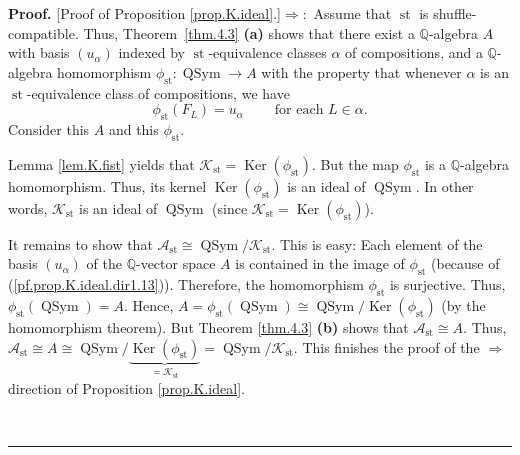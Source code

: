 \documentclass[numbers=enddot,12pt,final,onecolumn,notitlepage]{scrartcl}%
\theoremstyle{definition}
\newenvironment{proof}[1][Proof]{\noindent\textbf{#1.} }{\ \rule{0.5em}{0.5em}}
\newenvironment{verlong}{}{}
\begin{document}
\begin{verlong}
\begin{proof}
[Proof of Proposition \ref{prop.K.ideal}.]$\Longrightarrow:$ Assume that
$\operatorname*{st}$ is shuffle-compatible. Thus, Theorem~\ref{thm.4.3}
\textbf{(a)} shows that there exist a $\mathbb{Q}$-algebra $A$ with basis
$\left(  u_{\alpha}\right)  $ indexed by $\operatorname*{st}$-equivalence
classes $\alpha$ of compositions, and a $\mathbb{Q}$-algebra homomorphism
$\phi_{\operatorname*{st}}:\operatorname*{QSym}\rightarrow A$ with the
property that whenever $\alpha$ is an $\operatorname*{st}$-equivalence class
of compositions, we have%
\begin{equation}
\phi_{\operatorname*{st}}\left(  F_{L}\right)  =u_{\alpha}%
\ \ \ \ \ \ \ \ \ \ \text{for each }L\in\alpha.
\label{pf.prop.K.ideal.dir1.13}%
\end{equation}
Consider this $A$ and this $\phi_{\operatorname*{st}}$.

Lemma \ref{lem.K.fist} yields that $\mathcal{K}_{\operatorname*{st}%
}=\operatorname*{Ker}\left(  \phi_{\operatorname*{st}}\right)  $. But the map
$\phi_{\operatorname*{st}}$ is a $\mathbb{Q}$-algebra homomorphism. Thus, its
kernel $\operatorname*{Ker}\left(  \phi_{\operatorname*{st}}\right)  $ is an
ideal of $\operatorname*{QSym}$. In other words, $\mathcal{K}%
_{\operatorname*{st}}$ is an ideal of $\operatorname*{QSym}$ (since
$\mathcal{K}_{\operatorname*{st}}=\operatorname*{Ker}\left(  \phi
_{\operatorname*{st}}\right)  $).

It remains to show that $\mathcal{A}_{\operatorname*{st}}\cong%
\operatorname*{QSym}/\mathcal{K}_{\operatorname*{st}}$. This is easy: Each
element of the basis $\left(  u_{\alpha}\right)  $ of the $\mathbb{Q}$-vector
space $A$ is contained in the image of $\phi_{\operatorname*{st}}$ (because of
(\ref{pf.prop.K.ideal.dir1.13})). Therefore, the homomorphism $\phi
_{\operatorname*{st}}$ is surjective. Thus, $\phi_{\operatorname*{st}}\left(
\operatorname*{QSym}\right)  =A$. Hence, $A=\phi_{\operatorname*{st}}\left(
\operatorname*{QSym}\right)  \cong\operatorname*{QSym}/\operatorname*{Ker}%
\left(  \phi_{\operatorname*{st}}\right)  $ (by the homomorphism theorem). But
Theorem \ref{thm.4.3} \textbf{(b)} shows that $\mathcal{A}_{\operatorname*{st}%
}\cong A$. Thus, $\mathcal{A}_{\operatorname*{st}}\cong A\cong%
\operatorname*{QSym}/\underbrace{\operatorname*{Ker}\left(  \phi
_{\operatorname*{st}}\right)  }_{=\mathcal{K}_{\operatorname*{st}}%
}=\operatorname*{QSym}/\mathcal{K}_{\operatorname*{st}}$. This finishes the
proof of the $\Longrightarrow$ direction of Proposition \ref{prop.K.ideal}.


\end{proof}
\end{verlong}
\end{document}
